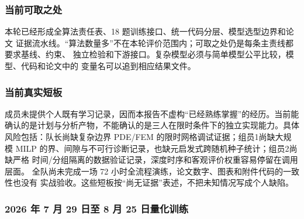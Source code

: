 \documentclass[UTF8,a4paper,12pt]{ctexart}
\begin{document}
\subsubsection{当前可取之处}

本轮已经形成全算法责任表、18 题训练接口、统一代码分层、模型选型边界和论文
证据流水线。“算法数量多”不在本轮评价范围内；可取之处仍是每条主责线都要求基线、约束、
独立检验和下游接口。复杂模型必须与简单模型公平比较，模型、代码和论文中的
变量名可以追到相应结果文件。

\subsubsection{当前真实短板}

成员未提供个人既有学习记录，因而本报告不虚构“已经熟练掌握”的经历。当前能
确认的是计划与分析产物，不能确认的是三人在限时条件下的独立实现能力。具体
风险包括：队长尚缺复杂边界 PDE/FEM 的限时网格调试证据；组员1尚缺大规模
MILP 的界、间隙与不可行诊断记录，也缺元启发式跨随机种子统计；组员2尚缺严格
时间/分组隔离的数据验证记录，深度时序和客观评价权重容易停留在调用层面。
全队尚未完成一场 72 小时全流程演练，论文数字、图表和附件代码的一致性也没有
实战验收。这些短板按“尚无证据”表述，不把未知情况写成个人缺陷。

\subsubsection{2026 年 7 月 29 日至 8 月 25 日量化训练}
\end{document}
